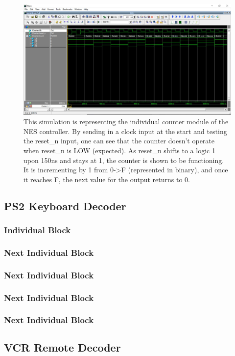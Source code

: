 \documentclass[a4paper]{article}
\begin{document}
\begin{figure}[H]
  \centering
    \includegraphics[width=.85\textwidth]{images/ModelSim/nescounter.JPG}
	\caption{This simulation is representing the individual counter module of the NES controller. By sending in a clock input at the start and testing the reset_n input, one can see that the counter doesn’t operate when reset_n is LOW (expected). As reset_n shifts to a logic 1 upon 150ns and stays at 1, the counter is shown to be functioning. It is incrementing by 1 from 0->F (represented in binary), and once it reaches F, the next value for the output returns to 0.}
    \label{fig:counter_sim}
\end{figure}

\subsection{PS2 Keyboard Decoder}
\subsubsection{Individual Block}
\subsubsection{Next Individual Block}
\subsubsection{Next Individual Block}
\subsubsection{Next Individual Block}
\subsubsection{Next Individual Block}

\subsection{VCR Remote Decoder}
\end{document}
